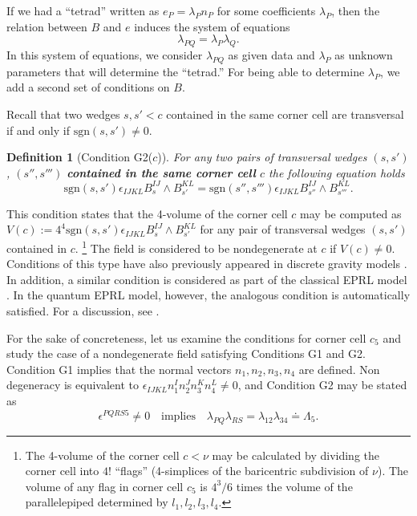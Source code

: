 \documentclass{article}
\newtheorem{definition}{Definition}
\begin{document}
If we had a ``tetrad'' written as $e_P = \lambda_P n_P$ for some coefficients $\lambda_P$, then the relation between $B$ and $e$ induces the system of equations 
\begin{equation}\label{lambdaEq1}
\lambda_{PQ} = \lambda_P \lambda_Q .	
\end{equation}
In this system of equations, we consider $\lambda_{PQ}$ as given data and $\lambda_P$ as unknown parameters that will determine the ``tetrad.'' For being able to determine $\lambda_P$, we add a second set of conditions on $B$. 

Recall that two wedges $s,s' < c$ contained in the same corner cell are transversal if and only if $\text{sgn}(s,s') \neq 0$. 

\begin{definition}[Condition G2($c$)]\label{G2}
	For any two pairs of transversal wedges $(s,s')$, $(s'',s''')$ {\bf contained in the same corner cell} $c$ the following equation holds 
\[
	\text{sgn}(s,s')\epsilon_{IJKL}B_s^{IJ}\wedge B_{s'}^{KL}=\text{sgn}(s'',s''')\epsilon_{IJKL}B_{s''}^{IJ}\wedge B_{s'''}^{KL}. 
\]
\end{definition}
%
This condition states that the 4-volume of the corner cell $c$ may be computed as $V(c):= 4^4 \text{sgn}(s,s')\epsilon_{IJKL}B_s^{IJ}\wedge B_{s'}^{KL}$ for any pair of transversal wedges $(s,s')$ contained in  $c$.%
\footnote{
The 4-volume of the corner cell $c<\nu$ may be calculated by dividing the corner cell into $4!$ ``flags'' (4-simplices of the baricentric subdivision of $\nu$). The volume of any flag in corner cell $c_5$ is $4^3/6$ times the volume of the parallelepiped determined by $l_1, l_2, l_3, l_4$.} 
The field is considered to be nondegenerate at $c$ if $V(c) \neq 0$.  
Conditions of this type have also previously appeared in discrete gravity models \cite{FD, Rei1}. In addition, a similar condition is considered as part of the classical EPRL model \cite{EPRL}. 
In the quantum EPRL model, however, the analogous condition is automatically satisfied. For a discussion, see \cite{Perez1}. 

For the sake of concreteness, let us examine the conditions for corner cell $c_{5}$ and study the case of a nondegenerate field satisfying Conditions G1 and G2. Condition G1 implies that the normal vectors $n_1, n_2, n_3, n_4$ are defined. 
Non degeneracy is equivalent to $\epsilon_{IJKL} n_1^I n_2^J n_3^K n_4^L \neq 0$, 
and Condition G2 may be stated as 
\begin{equation}\label{lambdaEq2}
	\epsilon^{PQRS5} \neq 0 \ \ \ \mbox{ implies } \ \ \ 
	\lambda_{PQ} \lambda_{RS} = \lambda_{12} \lambda_{34} \doteq \Lambda_5 . 
\end{equation}
\end{document}
